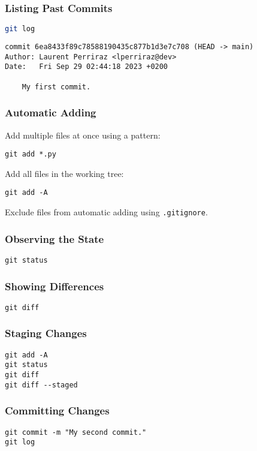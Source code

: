 \documentclass[12pt]{article}
\begin{document}
\subsubsection{Listing Past Commits}
\begin{lstlisting}[language=bash]
git log
\end{lstlisting}
\begin{lstlisting}
commit 6ea8433f89c78588190435c877b1d3e7c708 (HEAD -> main)
Author: Laurent Perriraz <lperriraz@dev>
Date:   Fri Sep 29 02:44:18 2023 +0200

    My first commit.
\end{lstlisting}

\subsubsection{Automatic Adding}
Add multiple files at once using a pattern:
\begin{lstlisting}
git add *.py
\end{lstlisting}
    
Add all files in the working tree:
\begin{lstlisting}
git add -A
\end{lstlisting}
    
Exclude files from automatic adding using \texttt{.gitignore}.

\subsubsection{Observing the State}
\begin{lstlisting}
git status
\end{lstlisting}

\subsubsection{Showing Differences}
\begin{lstlisting}
git diff
\end{lstlisting}

\subsubsection{Staging Changes}
\begin{lstlisting}
git add -A
git status
git diff
git diff --staged
\end{lstlisting}

\subsubsection{Committing Changes}
\begin{lstlisting}
git commit -m "My second commit."
git log
\end{lstlisting}
\end{document}

